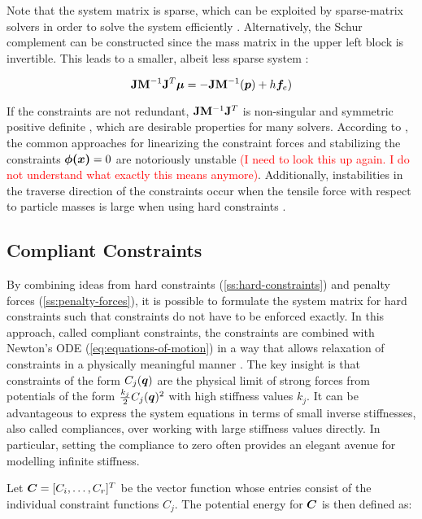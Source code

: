 Note that the system matrix is sparse, which can be exploited by sparse-matrix solvers in order to solve the system efficiently
\cite{baraff1996}. Alternatively, the Schur complement can be constructed since the mass matrix in the upper left block is invertible.
This leads to a smaller, albeit less sparse system \cite{tournier2015}:

\[
    \mathbf{J}\mathbf{M}^{-1}\mathbf{J}^T \bm{\mu} = -\mathbf{J}\mathbf{M}^{-1}(\bm{p}) + h \bm{f}_e)
\]

If the constraints are not redundant, $\mathbf{J}\mathbf{M}^{-1}\mathbf{J}^T$ is non-singular and symmetric positive definite \cite{baraff1996}, which are desirable
properties for many solvers. According to \cite{servin2006}, the common approaches for linearizing the constraint forces and stabilizing 
the constraints $\bm{\phi(x)} = 0$ are notoriously unstable \textcolor{red}{(I need to look this up again. I do not understand what exactly 
this means anymore)}. Additionally, instabilities in the traverse direction of the constraints occur when the tensile force with respect to 
particle masses is large when using hard constraints \cite{tournier2015}.

\subsection{Compliant Constraints}\label{ss:compliant-constraints}
By combining ideas from hard constraints (\cref{ss:hard-constraints}) and penalty forces (\cref{ss:penalty-forces}), it is possible to 
formulate the system matrix for hard constraints such that constraints do not have to be enforced exactly. In this approach, called compliant 
constraints, the constraints are combined with Newton's ODE (\cref{eq:equations-of-motion}) in a way that allows relaxation of constraints in a 
physically meaningful manner \cite{servin2006}. The key insight is that constraints 
of the form $C_j(\bm{q})$ are the physical limit of strong forces from potentials of the form $\frac{k_j}{2}C_j(\bm{q})^2$ with 
high stiffness values $k_j$. It can be advantageous to express the system equations in terms of small inverse stiffnesses, also 
called compliances, over working with large stiffness values directly. In particular, setting the compliance to zero often provides
an elegant avenue for modelling infinite stiffness. 

Let $\bm{C} = [C_i, \ldots, C_r]^T$ be the vector function whose entries consist of the individual constraint 
functions $C_j$. The potential energy for $\bm{C}$ is then defined as:

